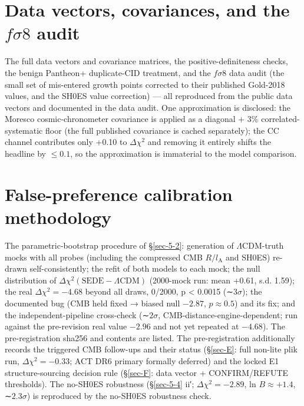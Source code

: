 \documentclass[preprint,12pt]{elsarticle}
\begin{document}
\section{\texorpdfstring{Data vectors, covariances, and the
\(f\sigma 8\)
audit}{Data vectors, covariances, and the f\textbackslash sigma 8 audit}}\label{sec-C}

The full data vectors and covariance matrices, the positive-definiteness
checks, the benign Pantheon+ duplicate-CID treatment, and the
\(f\sigma 8\) data audit (the small set of mis-entered growth points
corrected to their published Gold-2018 \citep{Sagredo:2018ahx} values,
and the SH0ES value correction) --- all reproduced from the public data
vectors and documented in the data audit. One approximation is
disclosed: the Moresco cosmic-chronometer covariance is applied as a
diagonal + 3\% correlated-systematic floor (the full published
covariance is cached separately); the CC channel contributes only +0.10
to \(\Delta \chi ^{2}\) and removing it entirely shifts the headline by
\(\leq  0.1\), so the approximation is immaterial to the model
comparison.

\section{False-preference calibration methodology}\label{sec-D}

The parametric-bootstrap procedure of §\ref{sec-5-2}: generation of
\(\Lambda \mathrm{CDM}\)-truth mocks with all probes (including the
compressed CMB \(R/l_{\mathrm{A}}\) and SH0ES) re-drawn
self-consistently; the refit of both models to each mock; the null
distribution of
\(\Delta \chi ^{2}(\mathrm{SEDE} - \Lambda \mathrm{CDM})\) (2000-mock
run: mean +0.61, s.d. 1.59); the real \(\Delta \chi ^{2}=-4.68\) beyond
all draws, 0/2000, p \textless{} 0.0015 (∼\(3\sigma\)); the documented
bug (CMB held fixed → biased null \(-2.87\), \(p \approx  0.5\)) and its
fix; and the independent-pipeline cross-check (∼\(2\sigma\),
CMB-distance-engine-dependent; run against the pre-revision real value
\(-2.96\) and not yet repeated at \(-4.68\)). The pre-registration
sha256 and contents are listed. The pre-registration additionally
records the triggered CMB follow-ups and their status (§\ref{sec-E}:
full non-lite plik run, \(\Delta \chi ^{2}=-0.33\); ACT DR6 primary
formally deferred) and the locked E1 structure-sourcing decision rule
(§\ref{sec-F}: data vector + CONFIRM/REFUTE thresholds). The no-SH0ES
robustness (§\ref{sec-5-4} ii′; \(\Delta \chi ^{2}=-2.89\), ln
\(B\approx +1.4\), ∼\(2.3\sigma\)) is reproduced by the no-SH0ES
robustness check.
\end{document}
